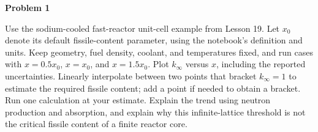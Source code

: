 \begingroup
\raggedbottom
\noindent\textbf{Problem 1}

Use the sodium-cooled fast-reactor unit-cell example from Lesson 19. Let
$x_0$ denote its default fissile-content parameter, using the notebook's
definition and units. Keep geometry, fuel density, coolant, and temperatures
fixed, and run cases with $x=0.5x_0$, $x=x_0$, and $x=1.5x_0$.
Plot $k_\infty$ versus $x$, including the reported uncertainties.
Linearly interpolate between two points that bracket $k_\infty=1$ to
estimate the required fissile content; add a point if needed to obtain a
bracket. Run one calculation at your estimate. Explain the trend using
neutron production and absorption, and explain why this infinite-lattice
threshold is not the critical fissile content of a finite reactor core.

